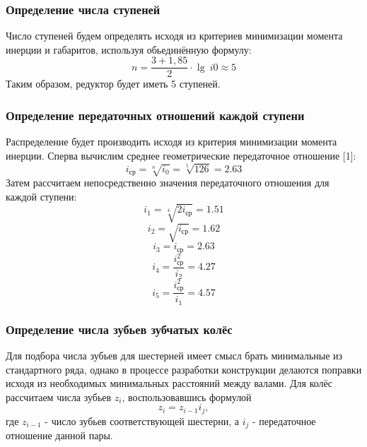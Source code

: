\documentclass[14pt,a4paper,russian]{scrartcl}
\begin{document}
    \subsubsection{Определение числа ступеней}
        Число ступеней будем определять исходя из критериев минимизации
        момента инерции и габаритов, используя обьединённую формулу:
         \[ n = \frac{3+1,85}{2}\cdot\lg\ i0 \approx 5 \]
        Таким образом, редуктор будет иметь 5 ступеней.
    
    \subsubsection{Определение передаточных отношений каждой ступени}
        Распределение будет производить исходя из критерия минимизации
        момента инерции.
        Сперва вычислим среднее геометрические передаточное отношение [1]:
        \newcommand{\iavr}{i_{\text{ср}}}
         \[ \iavr = \sqrt[n]{i_0} = \sqrt[5]{126} = 2.63 \]
        Затем рассчитаем непосредственно значения передаточного отношения для каждой ступени:
         \[ i_1 = \sqrt[4]{2\iavr} = 1.51 \]
        \[ i_2 = \sqrt{\iavr} = 1.62 \]
        \[ i_3 = \iavr = 2.63 \]
        \[ i_4 = \frac{\iavr^2}{i_2} = 4.27 \]
        \[ i_5 = \frac{\iavr^2}{i_1} = 4.57\]
    
    \subsubsection{Определение числа зубьев зубчатых колёс}
        Для подбора числа зубьев для шестерней имеет смысл брать минимальные из стандартного ряда,
        однако в процессе разработки конструкции делаются поправки исходя из необходимых
        минимальных расстояний между валами.
        Для колёс рассчитаем числа зубьев \( z_i \), воспользовавшись формулой
        \[ z_i = z_{i-1}i_j, \]
        где \( z_{i-1} \) - число зубьев соответствующей шестерни, а \( i_j \) - 
        передаточное отношение данной пары.
        
\end{document}
